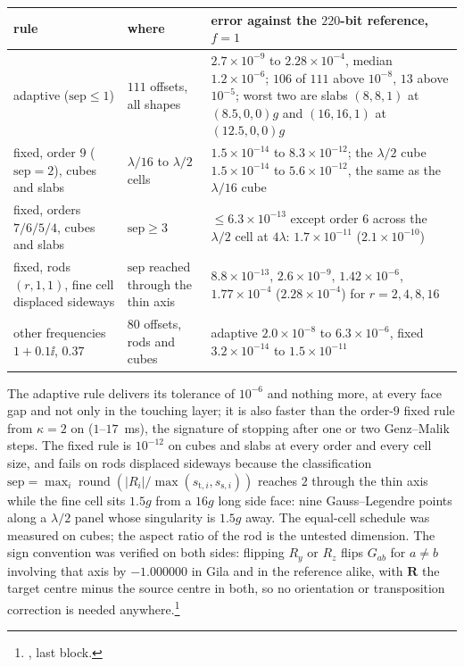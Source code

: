 \begin{center}\footnotesize
\begin{tabular}{@{}L{0.22\textwidth}L{0.26\textwidth}L{0.44\textwidth}@{}}
\toprule
rule & where & error against the $220$-bit reference, $f = 1$\\
\midrule
adaptive ($\mathrm{sep}\le1$) & $111$ offsets, all shapes & $2.7\times10^{-9}$ to
$2.28\times10^{-4}$, median $1.2\times10^{-6}$; $106$ of $111$ above $10^{-8}$, $13$
above $10^{-5}$; worst two are slabs $(8,8,1)$ at $(8.5,0,0)g$ and $(16,16,1)$ at
$(12.5,0,0)g$\\
fixed, order $9$ ($\mathrm{sep}=2$), cubes and slabs & $\lambda/16$ to $\lambda/2$ cells &
$1.5\times10^{-14}$ to $8.3\times10^{-12}$; the $\lambda/2$ cube $1.5\times10^{-14}$ to
$5.6\times10^{-12}$, the same as the $\lambda/16$ cube\\
fixed, orders $7/6/5/4$, cubes and slabs & $\mathrm{sep}\ge3$ & $\le6.3\times10^{-13}$
except order $6$ across the $\lambda/2$ cell at $4\lambda$: $1.7\times10^{-11}$
($2.1\times10^{-10}$)\\
fixed, rods $(r,1,1)$, fine cell displaced sideways & $\mathrm{sep}$ reached through the
thin axis & $8.8\times10^{-13}$, $2.6\times10^{-9}$, $1.42\times10^{-6}$,
$1.77\times10^{-4}$ ($2.28\times10^{-4}$) for $r = 2,4,8,16$\\
other frequencies $1+0.1\ii$, $0.37$ & $80$ offsets, rods and cubes & adaptive
$2.0\times10^{-8}$ to $6.3\times10^{-6}$, fixed $3.2\times10^{-14}$ to $1.5\times10^{-11}$\\
\bottomrule
\end{tabular}
\end{center}

\noindent
The adaptive rule delivers its tolerance of $10^{-6}$ and nothing more, at every face gap
and not only in the touching layer; it is also faster than the order-$9$ fixed rule from
$\kappa = 2$ on ($1$--$17$~ms), the signature of  stopping after one or two
Genz--Malik steps. The fixed rule is $10^{-12}$ on cubes and slabs at every order and every
cell size, and fails on rods displaced sideways because the classification
$\mathrm{sep} = \max_i\operatorname{round}(|R_i|/\max(s_{\mathrm{t},i},s_{\mathrm{s},i}))$
reaches $2$ through the thin axis while the fine cell sits $1.5g$ from a $16g$ long side
face: nine Gauss--Legendre points along a $\lambda/2$ panel whose singularity is $1.5g$
away. The equal-cell  schedule was measured on cubes; the aspect ratio of the
rod is the untested dimension. The sign convention was verified on both sides: flipping
$R_y$ or $R_z$ flips $G_{ab}$ for $a\ne b$ involving that axis by $-1.000000$ in Gila and
in the reference alike, with $\mathbf{R}$ the target centre minus the source centre in both,
so no orientation or transposition correction is needed anywhere.\footnote{, last block.}

